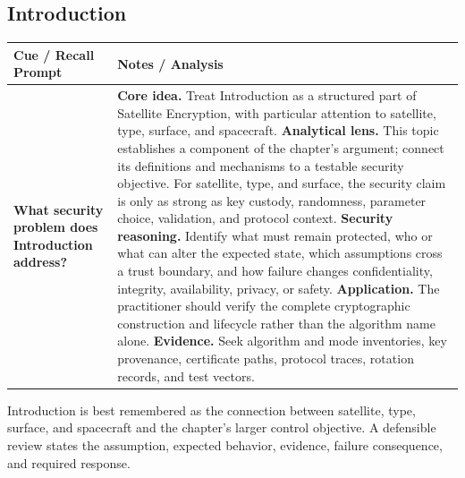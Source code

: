 \documentclass[11pt]{article}
\newcommand{\CornellHeader}{%
\rowcolor{Navy}\color{white}\bfseries Cue / Recall Prompt & \color{white}\bfseries Notes / Analysis\\\hline}
\newcommand{\CornellRow}[2]{%
\cellcolor{CueGray}\RaggedRight\textbf{#1} & \RaggedRight #2\\\hline}
\begin{document}
\subsection*{Introduction}
\begin{longtable}{>{\RaggedRight\arraybackslash}p{}|>{\RaggedRight\arraybackslash}p{}}
\CornellHeader
\CornellRow{What security problem does Introduction address?}{\textbf{Core idea.} Treat Introduction as a structured part of Satellite Encryption, with particular attention to satellite, type, surface, and spacecraft. \textbf{Analytical lens.} This topic establishes a component of the chapter's argument; connect its definitions and mechanisms to a testable security objective. For satellite, type, and surface, the security claim is only as strong as key custody, randomness, parameter choice, validation, and protocol context. \textbf{Security reasoning.} Identify what must remain protected, who or what can alter the expected state, which assumptions cross a trust boundary, and how failure changes confidentiality, integrity, availability, privacy, or safety. \textbf{Application.} The practitioner should verify the complete cryptographic construction and lifecycle rather than the algorithm name alone. \textbf{Evidence.} Seek algorithm and mode inventories, key provenance, certificate paths, protocol traces, rotation records, and test vectors.}
\end{longtable}
\begin{topicsummary}
Introduction is best remembered as the connection between satellite, type, surface, and spacecraft and the chapter's larger control objective. A defensible review states the assumption, expected behavior, evidence, failure consequence, and required response.
\end{topicsummary}
\end{document}
